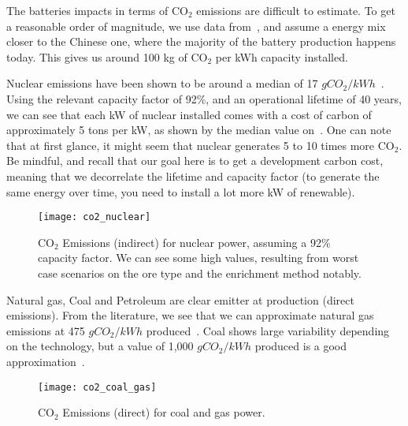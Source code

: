 The batteries impacts in terms of $\mathrm{CO_2}$ emissions are difficult to estimate. To get a reasonable order of magnitude, we use data from~, and assume a energy mix closer to the Chinese one, where the majority of the battery production happens today. This gives us around 100 kg of $\mathrm{CO_2}$ per kWh capacity installed.

Nuclear emissions have been shown to be around a median of 17 $gCO_2/kWh$~. Using the relevant capacity factor of 92\%, and an operational lifetime of 40 years, we can see that each kW of nuclear installed comes with a cost of carbon of approximately 
5 tons per kW, as shown by the median value on~. One can note that at first glance, it might seem that nuclear generates 5 to 10 times more $\mathrm{CO_2}$. Be mindful, and recall that our goal here is to get a development carbon cost, meaning that we decorrelate the lifetime and capacity factor (to generate the same energy over time, you need to install a lot more kW of renewable).

\begin{figure}[h]
	\texttt{[image: co2\_nuclear]}
	\caption[$\mathrm{CO_2}$ Emissions (indirect) for nuclear power.]{$\mathrm{CO_2}$ Emissions (indirect) for nuclear power, assuming a 92\% capacity factor. We can see some high values, resulting from worst case scenarios on the ore type and the enrichment method notably.}
\end{figure}

Natural gas, Coal and Petroleum are clear emitter at production (direct emissions). From the literature, we see that we can approximate natural gas emissions at 475 $gCO_2/kWh$ produced~. Coal shows large variability depending on the technology, but a value of 1,000 $gCO_2/kWh$ produced is a good approximation~.


\begin{figure}[h]
	\texttt{[image: co2\_coal\_gas]}
	\caption[$\mathrm{CO_2}$ Emissions (direct) for coal and gas power.]{$\mathrm{CO_2}$ Emissions (direct) for coal and gas power.}
\end{figure}


